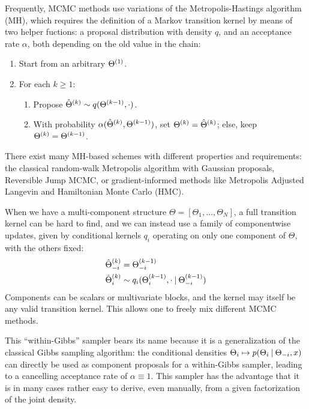 Frequently, MCMC methods use variations of the Metropolis-Hastings algorithm (MH), which requires the
definition of a Markov transition kernel by means of two helper fuctions: a proposal distribution
with density \(q\), and an acceptance rate \(\alpha\), both depending on the old value in the
chain:
\begin{enumerate}
\item Start from an arbitrary \(\kth[1]{\Theta}\).
\item For each \(k \ge 1\):
  \begin{enumerate}
  \item Propose \(\kth[k]{\hat{\Theta}} \sim q(\kth[k-1]{\Theta}, \cdot)\).
  \item With probability \(\alpha(\kth[k]{\hat{\Theta}}, \kth[k-1]{\Theta})\), set
    \(\kth[k]{\Theta} = \kth[k]{\hat{\Theta}}\); else, keep \(\kth[k]{\Theta} = \kth[k-1]{\Theta}\).
  \end{enumerate}
\end{enumerate}

There exist many MH-based schemes with different properties and requirements: the classical
random-walk Metropolis algorithm with Gaussian proposals, Reversible Jump MCMC, or gradient-informed
methods like Metropolis Adjusted Langevin and Hamiltonian Monte Carlo (HMC).

When we have a multi-component structure \(\Theta = [\Theta_1, \ldots, \Theta_N]\), a full
transition kernel can be hard to find, and we can instead use a family of componentwise updates,
given by conditional kernels \(q_{i}\) operating on only one component of \(\Theta\), with the
others fixed:
\begin{equation}
  \label{eq:conditional-kernels}
  \begin{aligned}
    \kth[k]{\hat{\Theta}}_{-i} &= \kth[k-1]{\Theta}_{-i} \\
    \kth[k]{\hat{\Theta}}_{i} &\sim q_{i}(\kth[k-1]{\Theta}_{i}, \cdot \given \kth[k-1]{\Theta}_{-i})
  \end{aligned}
\end{equation}
Components can be scalars or multivariate blocks, and the kernel may itself be any valid transition
kernel.  This allows one to freely mix different MCMC methods.

This \enquote{within-Gibbs} sampler bears its name because it is a generalization of the classical
Gibbs sampling algorithm: the conditional densities
\(\Theta_{i} \mapsto p(\Theta_{i} \given \Theta_{-i}, x)\) can directly be used as component
proposals for a within-Gibbs sampler, leading to a cancelling acceptance rate of
\(\alpha \equiv 1\).  This sampler has the advantage that it is in many cases rather easy to derive,
even manually, from a given factorization of the joint density.


